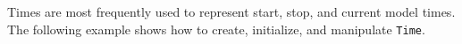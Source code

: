 
Times are most frequently used to represent start, stop, and current 
model times.  The following example shows how to create, initialize, and
manipulate {\tt Time}.


